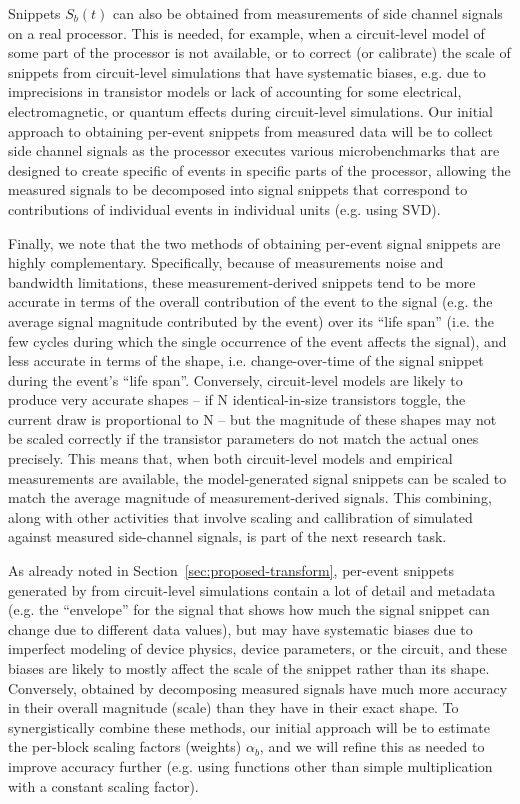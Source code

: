 Snippets $S_b(t)$ can also be obtained from measurements of side channel signals on a real processor. This is needed, for example, when a circuit-level model of some part of the processor is not available, or to correct (or calibrate) the scale of snippets from circuit-level simulations that have systematic biases, e.g. due to imprecisions in transistor models or lack of accounting for some electrical, electromagnetic, or quantum effects during circuit-level simulations. Our initial approach to obtaining per-event snippets from measured data will
be to collect side channel signals as the processor executes various microbenchmarks that are designed to create specific of events in specific parts of the processor, allowing the measured signals to be decomposed into signal snippets that correspond to contributions of individual events in individual units (e.g. using SVD).

Finally, we note that the two methods of obtaining per-event signal snippets are highly complementary. Specifically, because of measurements noise and bandwidth limitations, these measurement-derived snippets tend to be more accurate in terms of the overall contribution of the event to the signal (e.g. the average signal magnitude contributed by the event) over its ``life span'' (i.e. the few cycles during which the single occurrence of the event affects the signal), and less accurate in terms of the shape, i.e. change-over-time of the signal snippet during the event's ``life span''. Conversely, circuit-level models are likely to produce very accurate shapes -- if N identical-in-size transistors toggle, the current draw is proportional to N -- but the magnitude of these shapes may not be scaled correctly if the transistor parameters do not match the actual ones precisely. This means that, when both circuit-level models and empirical measurements are available, the model-generated signal snippets can be scaled to match the average magnitude of measurement-derived signals. This combining, along with other activities that involve scaling and callibration of simulated against measured side-channel signals, is part of the next research task.

As already noted in Section~\ref{sec:proposed-transform}, per-event snippets generated by from circuit-level simulations contain a lot of detail and metadata (e.g. the ``envelope'' for the signal that shows how much the signal snippet can change due to different data values), but may have systematic biases due to imperfect modeling of device physics, device parameters, or the circuit, and these biases are likely to mostly affect the scale of the snippet rather than its shape. Conversely, obtained by decomposing measured signals have much more accuracy in their overall magnitude (scale) than they have in their exact shape. To synergistically combine these methods, our initial approach will be to estimate the per-block scaling factors (weights) $\alpha_b$, and we will refine this as needed to improve accuracy further (e.g. using functions other than simple multiplication with a constant scaling factor).

